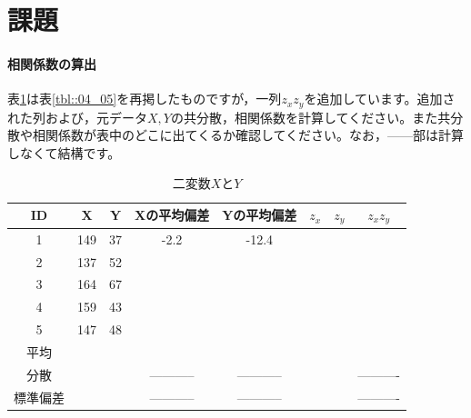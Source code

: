 \documentclass{ltjbook}
\begin{document}
\section{課題}
\paragraph{相関係数の算出}
表\ref{tbl::m04_05again}は表\ref{tbl::04_05}を再掲したものですが，一列$z_x z_y$を追加しています。追加された列および，元データ$X,Y$の共分散，相関係数を計算してください。また共分散や相関係数が表中のどこに出てくるか確認してください。なお，------部は計算しなくて結構です。
\begin{table}[ht]
	\centering
	\caption{二変数$X$と$Y$}
	\begin{tabular}{cccccccc}
		\hline
		ID   & X   & Y  & Xの平均偏差      & Yの平均偏差      & $z_x$ & $z_y$ & $z_x z_y$  \\
		\hline
		1    & 149 & 37 & -2.2        & -12.4       &       &       &            \\
		2    & 137 & 52 &             &             &       &       &            \\
		3    & 164 & 67 &             &             &       &       &            \\
		4    & 159 & 43 &             &             &       &       &            \\
		5    & 147 & 48 &             &             &       &       &            \\
		\hline
		平均   &     &    &             &             &       &       &            \\
		分散   &     &    & ----------- & ----------- &       &       & ---------- \\
		標準偏差 &     &    & ----------- & ----------- &       &       & ---------- \\\hline
	\end{tabular}
	\label{tbl::m04_05again}
\end{table}
\end{document}
